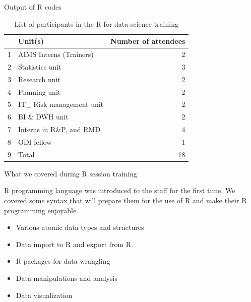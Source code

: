 \documentclass[ignorenonframetext,]{beamer}
\providecommand{\tightlist}{%
  \setlength{\itemsep}{0pt}\setlength{\parskip}{0pt}}
\begin{document}
\begin{frame}{Output of R codes}

\begin{table}[ht]
\centering
\caption{List of participants in the R for data science training} 
\begin{tabular}{rlr}
  \hline
 & Unit(s) & Number of attendees \\ 
  \hline
1 & AIMS Interns (Trainers) & 2 \\ 
  2 & Statistics unit & 3 \\ 
  3 & Research unit & 2 \\ 
  4 & Planning unit & 2 \\ 
  5 & IT\_ Risk management unit & 2 \\ 
  6 & BI \& DWH unit & 2 \\ 
  7 & Interns in R\&P, and RMD & 4 \\ 
  8 & ODI fellow & 1 \\ 
  9 & Total & 18 \\ 
   \hline
\end{tabular}
\end{table}

\end{frame}

\begin{frame}{What we covered during R session training}

R programming language was introduced to the staff for the first time.
We covered some syntax that will prepare them for the use of R and make
their R programming enjoyable.

\begin{itemize}
\tightlist
\item
  Various atomic data types and structures
\item
  Data import to R and export from R.
\item
  R packages for data wrangling
\item
  Data manipulations and analysis
\item
  Data visualization
\end{itemize}

\end{frame}
\end{document}

